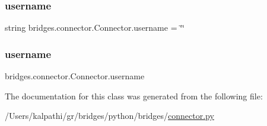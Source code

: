 \subsubsection{\texorpdfstring{username}{username}\hspace{0.1cm}{\footnotesize\ttfamily [1/2]}}
{\footnotesize\ttfamily string bridges.\+connector.\+Connector.\+username = \char`\"{}\char`\"{}\hspace{0.3cm}{\ttfamily [static]}}

\mbox{\label{classbridges_1_1connector_1_1_connector_adeb8d1b493eae70c24127fb175e1bfe7}} 
\subsubsection{\texorpdfstring{username}{username}\hspace{0.1cm}{\footnotesize\ttfamily [2/2]}}
{\footnotesize\ttfamily bridges.\+connector.\+Connector.\+username}



The documentation for this class was generated from the following file\+:\begin{DoxyCompactItemize}
\item 
/\+Users/kalpathi/gr/bridges/python/bridges/\mbox{\hyperlink{connector_8py}{connector.\+py}}\end{DoxyCompactItemize}
